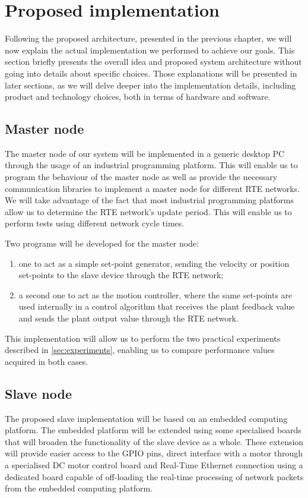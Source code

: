 \section{Proposed implementation}
Following the proposed architecture, presented in the previous chapter, we will now explain the actual implementation we performed to achieve our goals.
This section briefly presents the overall idea and proposed system architecture without going into details about specific choices.
Those explanations will be presented in later sections, as we will delve deeper into the implementation details, including product and technology choices, both in terms of hardware and software.

\subsection{Master node}
The master node of our system will be implemented in a generic desktop PC through the usage of an industrial programming platform.
This will enable us to program the behaviour of the master node as well as provide the necessary communication libraries to implement a master node for different RTE networks.
We will take advantage of the fact that most industrial programming platforms allow us to determine the RTE network's update period.
This will enable us to perform tests using different network cycle times.

Two programs will be developed for the master node:
\begin{enumerate}
	\item one to act as a simple set-point generator, sending the velocity or position set-points to the slave device through the RTE network;
	\item a second one to act as the motion controller, where the same set-points are used internally in a control algorithm that receives the plant feedback value and sends the plant output value through the RTE network.
\end{enumerate}

This implementation will allow us to perform the two practical experiments described in \autoref{sec:experiments}, enabling us to compare performance values acquired in both cases.

\subsection{Slave node}
The proposed slave implementation will be based on an embedded computing platform.
The embedded platform will be extended using some specialised boards that will broaden the functionality of the slave device as a whole.
These extension will provide easier access to the GPIO pins, direct interface with a motor through a specialised DC motor control board and Real-Time Ethernet connection using a dedicated board capable of off-loading the real-time processing of network packets from the embedded computing platform.

